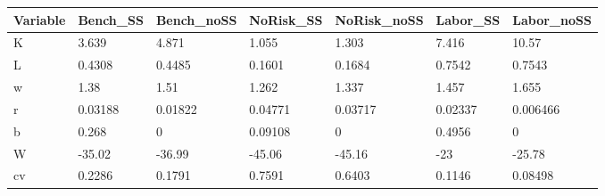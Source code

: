 \begin{tabular}{lllllll}
\hline 
Variable & Bench\_SS & Bench\_noSS & NoRisk\_SS & NoRisk\_noSS & Labor\_SS & Labor\_noSS \\ 
\hline 
K & 3.639 & 4.871 & 1.055 & 1.303 & 7.416 & 10.57 \\ 
L & 0.4308 & 0.4485 & 0.1601 & 0.1684 & 0.7542 & 0.7543 \\ 
w & 1.38 & 1.51 & 1.262 & 1.337 & 1.457 & 1.655 \\ 
r & 0.03188 & 0.01822 & 0.04771 & 0.03717 & 0.02337 & 0.006466 \\ 
b & 0.268 & 0 & 0.09108 & 0 & 0.4956 & 0 \\ 
W & -35.02 & -36.99 & -45.06 & -45.16 & -23 & -25.78 \\ 
cv & 0.2286 & 0.1791 & 0.7591 & 0.6403 & 0.1146 & 0.08498 \\ 
\hline 
\end{tabular}